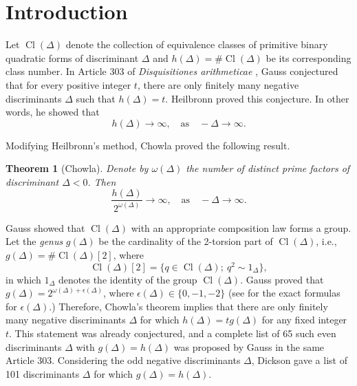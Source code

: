 \documentclass[12pt]{amsart}
\newtheorem{theorem}{Theorem}[section]
\theoremstyle{definition}
\numberwithin{equation}{section}
\DeclareMathOperator{\Cl}{Cl}
\begin{document}
\noindent


\section{Introduction}

Let $\Cl(\Delta)$ denote the collection of equivalence classes of primitive binary quadratic forms of discriminant $\Delta$ and $h(\Delta)=\#\Cl(\Delta)$ be its corresponding class number. In Article 303 of \textit{Disquisitiones arithmeticae} \cite{Gauss}, Gauss 
conjectured that
for every positive integer $t$, there are only finitely many negative discriminants $\Delta$ such that $h(\Delta)=t$.
Heilbronn  \cite{Heilbronn} proved this conjecture. In other words, he showed that
\begin{equation*}
h(\Delta) \rightarrow \infty,  \quad \text{as} \quad -\Delta \rightarrow \infty.
\end{equation*}

Modifying Heilbronn's method, Chowla \cite{Chowla} proved the following result.


\begin{theorem}[Chowla] \label{theorem, Chowla}
Denote by $\omega(\Delta)$ the number of distinct prime factors of  discriminant $\Delta<0$. Then
\begin{equation*}
\frac{	h(\Delta)}{2^{\omega(\Delta)}} \rightarrow \infty,  \quad \text{as} \quad -\Delta \rightarrow \infty.
\end{equation*}
\end{theorem}
Gauss showed that $\Cl(\Delta)$ with an appropriate composition law forms a group. Let the \emph{genus} $g(\Delta)$ be the cardinality of the 2-torsion part of $\Cl(\Delta)$, i.e., $g(\Delta)=\#\Cl(\Delta)[2]$, where
\begin{equation*}
\Cl(\Delta)[2]=\{q\in \Cl(\Delta);~q^2\sim 1_\Delta\},
\end{equation*}
 in which $1_\Delta$ denotes the identity of the group $\Cl(\Delta)$. Gauss proved that $g(\Delta)=2^{\omega(\Delta)+\epsilon(\Delta)}$, where $\epsilon(\Delta)\in \{0, -1, -2\}$ (see \cite[Section 2.2]{Kani} for the exact formulas for $\epsilon(\Delta)$.) Therefore, Chowla's theorem implies that there are only finitely many negative discriminants $\Delta$ for which   
$h(\Delta)=t g(\Delta)$ for any fixed integer $t$. This statement was already conjectured, and a complete list of 65 such even discriminants $\Delta$ with $g(\Delta)=h(\Delta)$ was proposed by Gauss in the same Article 303. Considering the odd negative discriminants $\Delta$, Dickson \cite[pp. 88-89]{Dickson} gave a list of 101 discriminants $\Delta$ for which $g(\Delta)=h(\Delta)$.
\end{document}
